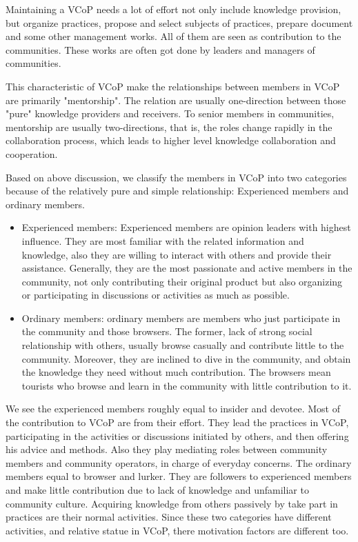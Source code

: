 \documentclass{elsarticle}
\begin{document}
Maintaining a VCoP needs a lot of effort not only include knowledge
provision, but organize practices, propose and select subjects of
practices, prepare document and some other management works. All of
them are seen as contribution to the communities. These
works are often got done by leaders and managers of communities.

  

This characteristic of VCoP make the relationships between members
in VCoP are primarily "mentorship". The relation are usually one-direction between those "pure" knowledge providers and receivers. To
senior members in communities, mentorship are usually two-directions,
that is,  the roles change rapidly in the collaboration process,
which leads to higher level knowledge collaboration and cooperation.
   
Based on above discussion,
we classify the members in VCoP into two categories because of the
relatively pure and simple relationship:   Experienced members and  ordinary members.

\begin{itemize}
\item   Experienced members: Experienced members are opinion leaders with highest influence. They are most familiar with the related information and knowledge, also they are willing to interact with others and provide their assistance. Generally, they are the most passionate and active members in the community, not only contributing their original product but also organizing or participating in discussions or activities as much as possible. 

\item  Ordinary members: ordinary members are members who just
participate in the community and those browsers. The former, lack of
strong social relationship with others, usually browse casually and
contribute little to the community. Moreover, they are inclined to
dive in the community, and obtain the knowledge they need without much
contribution. The browsers mean tourists who browse and learn in the
community with little contribution to it. 
\end{itemize}

We see the  experienced members roughly equal to insider and
devotee. Most of the contribution to VCoP are from their effort. They
lead the practices in VCoP, participating in the activities or
discussions initiated by others, and then offering his advice and
methods. Also they play mediating roles between community members and community operators, in charge of everyday concerns.
 The ordinary members equal to browser and lurker. They are followers
 to experienced members and make little contribution due to lack of
 knowledge and unfamiliar to community culture. Acquiring knowledge
 from others passively by take part in practices are their normal
 activities. Since these two categories have different activities, and
 relative statue in VCoP, there motivation factors are different too.
\end{document}
